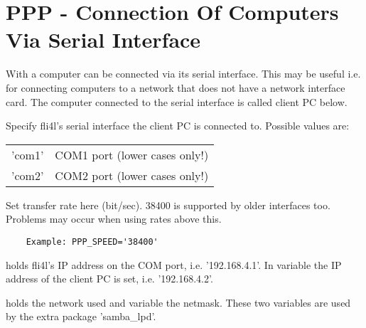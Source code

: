 {
\section {PPP - Connection Of Computers Via Serial Interface}
}

    With  a computer can be connected via its serial 
    interface. This may be useful i.e. for connecting computers to a network 
    that does not have a network interface card. The computer connected to the serial
    interface is called client PC below.

\begin{description}

        Specify fli4l's serial interface the client PC is connected to. Possible 
        values are:

        \begin{tabular}[h]{l l}
          'com1' &           COM1 port (lower cases only!) \\
          'com2' &           COM2 port (lower cases only!) \\
        \end{tabular}


        Set transfer rate here (bit/sec). 38400 is supported by older interfaces too. 
        Problems may occur when using rates above this.

\begin{example}
\begin{verbatim}
    Example: PPP_SPEED='38400'            
\end{verbatim}
\end{example}




         holds fli4l's  IP address on the COM port, i.e. '192.168.4.1'. 
        In variable  the IP address of the client PC is set, i.e. '192.168.4.2'.

        
        
         holds the network used and variable  
        the netmask. These two variables are used by the extra package 'samba\_lpd'.


\end{description}

